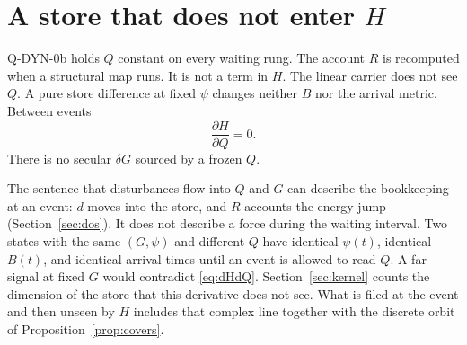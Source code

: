\section{\texorpdfstring{A store that does not enter \(H\)}{A store that does not enter H}}
\label{sec:h-gravq}

Q-DYN-0b holds \(Q\) constant on every waiting rung.
The account \(R\) is recomputed when a structural map runs.
It is not a term in \(H\).
The linear carrier does not see \(Q\).
A pure store difference at fixed \(\psi\) changes neither \(B\) nor the
arrival metric.
Between events
\begin{equation}
\label{eq:dHdQ}
\frac{\partial H}{\partial Q}=0.
\end{equation}
There is no secular \(\delta G\) sourced by a frozen \(Q\).

The sentence that disturbances flow into \(Q\) and \(G\) can describe the
bookkeeping at an event: \(d\) moves into the store, and \(R\) accounts the
energy jump (Section~\ref{sec:dos}).
It does not describe a force during the waiting interval.
Two states with the same \((G,\psi)\) and different \(Q\) have identical
\(\psi(t)\), identical \(B(t)\), and identical arrival times until an event
is allowed to read \(Q\).
A far signal at fixed \(G\) would contradict \eqref{eq:dHdQ}.
Section~\ref{sec:kernel} counts the dimension of the store that this
derivative does not see.
What is filed at the event and then unseen by \(H\) includes that complex
line together with the discrete orbit of Proposition~\ref{prop:covers}.
